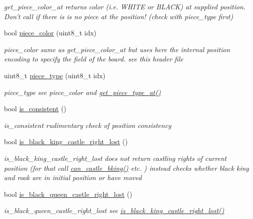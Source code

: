 \begin{DoxyCompactItemize}
\begin{DoxyCompactList}\small\item\em get\-\_\-piece\-\_\-color\-\_\-at returns color (i.\-e. W\-H\-I\-T\-E or B\-L\-A\-C\-K) at supplied position. Don't call if there is is no piece at the position! (check with piece\-\_\-type first) \end{DoxyCompactList}\item 
bool \hyperlink{classchess_1_1Board_a8b8cad6d67c80c279fb79d6438571c31}{piece\-\_\-color} (uint8\-\_\-t idx)
\begin{DoxyCompactList}\small\item\em piece\-\_\-color same as get\-\_\-piece\-\_\-color\-\_\-at but uses here the internal position encoding to specify the field of the board. see this header file \end{DoxyCompactList}\item 
uint8\-\_\-t \hyperlink{classchess_1_1Board_a72d50dca97ed1da2254f37d6635eb8af}{piece\-\_\-type} (uint8\-\_\-t idx)
\begin{DoxyCompactList}\small\item\em piece\-\_\-type see piece\-\_\-color and \hyperlink{classchess_1_1Board_a335cf36085d8de6a2ad784f12fa3ea87}{get\-\_\-piece\-\_\-type\-\_\-at()} \end{DoxyCompactList}\item 
bool \hyperlink{classchess_1_1Board_a56972d814d398cdcb152b09aa4156965}{is\-\_\-consistent} ()
\begin{DoxyCompactList}\small\item\em is\-\_\-consistent rudimentary check of position consistency \end{DoxyCompactList}\item 
bool \hyperlink{classchess_1_1Board_a4d4dcba09aa3863ad90bb170d7d928be}{is\-\_\-black\-\_\-king\-\_\-castle\-\_\-right\-\_\-lost} ()
\begin{DoxyCompactList}\small\item\em is\-\_\-black\-\_\-king\-\_\-castle\-\_\-right\-\_\-lost does not return castling rights of current position (for that call \hyperlink{classchess_1_1Board_a2c840ad4473c74959ed396773b98e3b9}{can\-\_\-castle\-\_\-bking()} etc. ) instead checks whether black king and rook are in initial position or have moved \end{DoxyCompactList}\item 
bool \hyperlink{classchess_1_1Board_ac92f5282b668129747f57993528f4e0a}{is\-\_\-black\-\_\-queen\-\_\-castle\-\_\-right\-\_\-lost} ()
\begin{DoxyCompactList}\small\item\em is\-\_\-black\-\_\-queen\-\_\-castle\-\_\-right\-\_\-lost see \hyperlink{classchess_1_1Board_a4d4dcba09aa3863ad90bb170d7d928be}{is\-\_\-black\-\_\-king\-\_\-castle\-\_\-right\-\_\-lost()} \end{DoxyCompactList}\item 

\end{DoxyCompactItemize}
